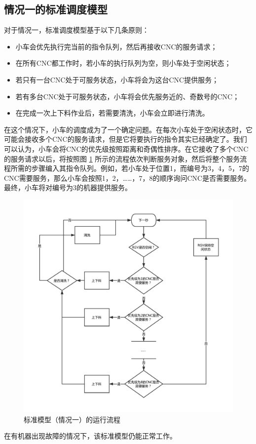 \documentclass{cumcmthesis}
\begin{document}
	\subsection{情况一的标准调度模型}
	对于情况一，标准调度模型基于以下几条原则：
	\begin{itemize}
		\item 小车会优先执行完当前的指令队列，然后再接收CNC的服务请求；
		\item 在所有CNC都工作时，若小车的执行队列为空，则小车处于空闲状态；
		\item 若只有一台CNC处于可服务状态，小车将会为这台CNC提供服务；
		\item 若有多台CNC处于可服务状态，小车将会优先服务近的、奇数号的CNC；
		\item 在完成一次上下料作业后，若需要清洗，小车会立即进行清洗。
	\end{itemize}
	在这个情况下，小车的调度成为了一个确定问题。在每次小车处于空闲状态时，它可能会接收多个CNC的服务请求，但是它将要执行的指令其实已经确定了。我们可以认为，小车会将CNC的优先级按照距离和奇偶性排序。在它接收了多个CNC的服务请求以后，将按照图 \ref{StandardModelCondition1} 所示的流程依次判断服务对象，然后将整个服务流程所需的步骤编入其指令队列。例如，若小车处于位置1，而编号为3，4，5，7的CNC需要服务，那么小车会按照1，2，……，7，8的顺序询问CNC是否需要服务。最终，小车将对编号为3的机器提供服务。
	\begin{figure}
		\centering
		\includegraphics[width=.7\linewidth]{simple_model_1.pdf}
		\caption{标准模型（情况一）的运行流程}\label{StandardModelCondition1}
	\end{figure}
	在有机器出现故障的情况下，该标准模型仍能正常工作。
\end{document}
